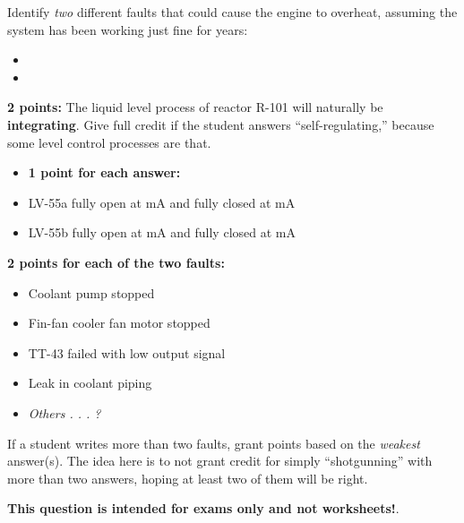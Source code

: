 \vskip 10pt

Identify {\it two} different faults that could cause the engine to overheat, assuming the system has been working just fine for years:

\begin{itemize}
\item{} 
\vskip 5pt
\item{} 
\end{itemize}







{\bf 2 points:} The liquid level process of reactor R-101 will naturally be {\bf integrating}.  Give full credit if the student answers ``self-regulating,'' because some level control processes are that.

\vskip 10pt

\begin{itemize}
\item{} {\bf 1 point for each answer:}
\item{} LV-55a fully open at  mA and fully closed at  mA
\item{} LV-55b fully open at  mA and fully closed at  mA
\end{itemize}

\vskip 10pt

{\bf 2 points for each of the two faults:}

\begin{itemize}
\item{} Coolant pump stopped
\item{} Fin-fan cooler fan motor stopped
\item{} TT-43 failed with low output signal
\item{} Leak in coolant piping
\item{} {\it Others . . . ?}
\end{itemize}

If a student writes more than two faults, grant points based on the {\it weakest} answer(s).  The idea here is to not grant credit for simply ``shotgunning'' with more than two answers, hoping at least two of them will be right.








{\bf This question is intended for exams only and not worksheets!}.



